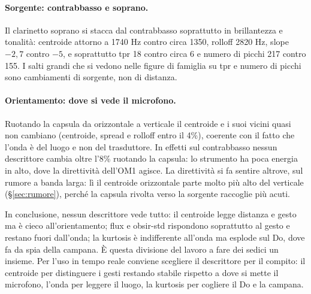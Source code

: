 \documentclass[11pt,a4paper]{article}
\begin{document}
\paragraph{Sorgente: contrabbasso e soprano.} Il clarinetto soprano si stacca dal contrabbasso
soprattutto in brillantezza e tonalità: centroide attorno a 1740 Hz contro circa 1350,
rolloff 2820 Hz, slope $-2{,}7$ contro $-5$, e soprattutto tpr
18 contro circa 6 e numero di picchi 217 contro 155. I salti grandi che si vedono nelle figure
di famiglia su tpr e numero di picchi sono cambiamenti di sorgente, non di distanza.

\paragraph{Orientamento: dove si vede il microfono.} Ruotando la capsula da orizzontale a
verticale il centroide e i suoi vicini quasi non cambiano (centroide, spread e rolloff entro
il 4\%), coerente con il fatto che l'onda è del luogo e non del trasduttore. In effetti sul
contrabbasso nessun descrittore cambia oltre l'8\% ruotando la capsula: lo strumento ha poca
energia in alto, dove la direttività dell'OM1 agisce. La direttività si fa sentire altrove,
sul rumore a banda larga: lì il centroide orizzontale parte molto più alto del verticale
(§\ref{sec:rumore}), perché la capsula rivolta verso la sorgente raccoglie più acuti.

In conclusione, nessun descrittore vede tutto: il centroide legge distanza e gesto ma è cieco
all'orientamento; flux e obsir-std rispondono soprattutto al gesto e restano fuori dall'onda;
la kurtosis è indifferente all'onda ma esplode sul Do, dove fa da spia della campana. È questa
divisione del lavoro a fare dei sedici un insieme. Per l'uso in tempo reale conviene scegliere
il descrittore per il compito: il centroide per distinguere i gesti restando stabile rispetto
a dove si mette il microfono, l'onda per leggere il luogo, la kurtosis per cogliere il Do e
la campana.
\end{document}
